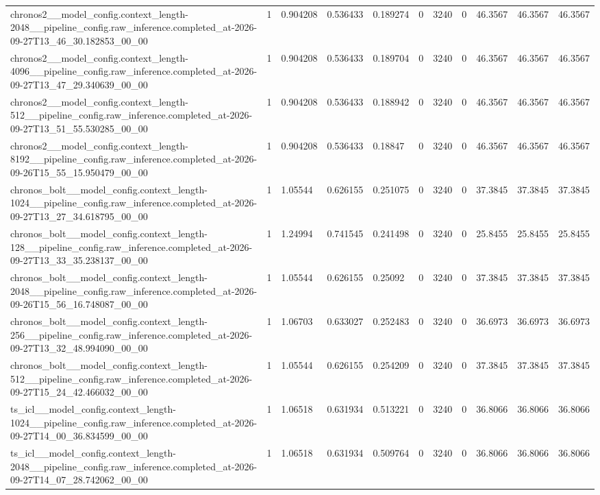 \begin{tabular}{lllllllllll}
chronos2\_\_model\_config.context\_length-2048\_\_pipeline\_config.raw\_inference.completed\_at-2026-09-27T13\_46\_30.182853\_00\_00 & 1 & 0.904208 & 0.536433 & 0.189274 & 0 & 3240 & 0 & 46.3567 & 46.3567 & 46.3567 \\
chronos2\_\_model\_config.context\_length-4096\_\_pipeline\_config.raw\_inference.completed\_at-2026-09-27T13\_47\_29.340639\_00\_00 & 1 & 0.904208 & 0.536433 & 0.189704 & 0 & 3240 & 0 & 46.3567 & 46.3567 & 46.3567 \\
chronos2\_\_model\_config.context\_length-512\_\_pipeline\_config.raw\_inference.completed\_at-2026-09-27T13\_51\_55.530285\_00\_00 & 1 & 0.904208 & 0.536433 & 0.188942 & 0 & 3240 & 0 & 46.3567 & 46.3567 & 46.3567 \\
chronos2\_\_model\_config.context\_length-8192\_\_pipeline\_config.raw\_inference.completed\_at-2026-09-26T15\_55\_15.950479\_00\_00 & 1 & 0.904208 & 0.536433 & 0.18847 & 0 & 3240 & 0 & 46.3567 & 46.3567 & 46.3567 \\
chronos\_bolt\_\_model\_config.context\_length-1024\_\_pipeline\_config.raw\_inference.completed\_at-2026-09-27T13\_27\_34.618795\_00\_00 & 1 & 1.05544 & 0.626155 & 0.251075 & 0 & 3240 & 0 & 37.3845 & 37.3845 & 37.3845 \\
chronos\_bolt\_\_model\_config.context\_length-128\_\_pipeline\_config.raw\_inference.completed\_at-2026-09-27T13\_33\_35.238137\_00\_00 & 1 & 1.24994 & 0.741545 & 0.241498 & 0 & 3240 & 0 & 25.8455 & 25.8455 & 25.8455 \\
chronos\_bolt\_\_model\_config.context\_length-2048\_\_pipeline\_config.raw\_inference.completed\_at-2026-09-26T15\_56\_16.748087\_00\_00 & 1 & 1.05544 & 0.626155 & 0.25092 & 0 & 3240 & 0 & 37.3845 & 37.3845 & 37.3845 \\
chronos\_bolt\_\_model\_config.context\_length-256\_\_pipeline\_config.raw\_inference.completed\_at-2026-09-27T13\_32\_48.994090\_00\_00 & 1 & 1.06703 & 0.633027 & 0.252483 & 0 & 3240 & 0 & 36.6973 & 36.6973 & 36.6973 \\
chronos\_bolt\_\_model\_config.context\_length-512\_\_pipeline\_config.raw\_inference.completed\_at-2026-09-27T15\_24\_42.466032\_00\_00 & 1 & 1.05544 & 0.626155 & 0.254209 & 0 & 3240 & 0 & 37.3845 & 37.3845 & 37.3845 \\
ts\_icl\_\_model\_config.context\_length-1024\_\_pipeline\_config.raw\_inference.completed\_at-2026-09-27T14\_00\_36.834599\_00\_00 & 1 & 1.06518 & 0.631934 & 0.513221 & 0 & 3240 & 0 & 36.8066 & 36.8066 & 36.8066 \\
ts\_icl\_\_model\_config.context\_length-2048\_\_pipeline\_config.raw\_inference.completed\_at-2026-09-27T14\_07\_28.742062\_00\_00 & 1 & 1.06518 & 0.631934 & 0.509764 & 0 & 3240 & 0 & 36.8066 & 36.8066 & 36.8066 \\

\end{tabular}
